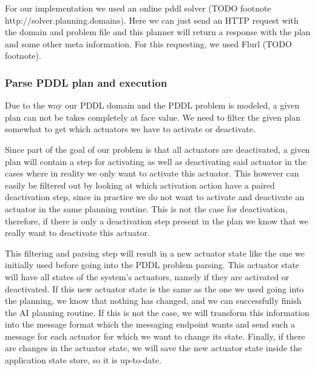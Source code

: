 For our implementation we used an online pddl solver (TODO footnote http://solver.planning.domains).
Here we can just send an HTTP request with the domain and problem file and this planner will return a response with the plan and some other meta information.
For this requesting, we used Flurl (TODO footnote).

\subsubsection{Parse PDDL plan and execution}\label{subsubsec:parse-pddl-plan-and-execution}
Due to the way our PDDL domain and the PDDL problem is modeled, a given plan can not be takes completely at face value.
We need to filter the given plan somewhat to get which actuators we have to activate or deactivate.

Since part of the goal of our problem is that all actuators are deactivated, a given plan will contain a step for activating as well as deactivating said actuator in the cases where in reality we only want to activate this actuator.
This however can easily be filtered out by looking at which activation action have a paired deactivation step, since in practice we do not want to activate and deactivate an actuator in the same planning routine.
This is not the case for deactivation, therefore, if there is only a deactivation step present in the plan we know that we really want to deactivate this actuator.

This filtering and parsing step will result in a new actuator state like the one we initially used before going into the PDDL problem parsing.
This actuator state will have all states of the system's actuators, namely if they are activated or deactivated.
If this new actuator state is the same as the one we used going into the planning, we know that nothing has changed, and we can successfully finish the AI planning routine.
If this is not the case, we will transform this information into the message format which the messaging endpoint wants and send such a message for each actuator for which we want to change its state.
Finally, if there are changes in the actuator state, we will save the new actuator state inside the application state store, so it is up-to-date.

